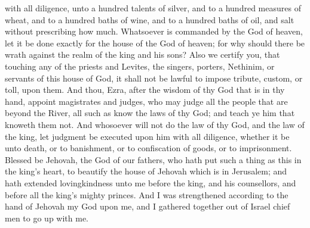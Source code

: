 with all diligence, unto a hundred talents of silver, and to a hundred measures of wheat, and to a hundred baths of wine, and to a hundred baths of oil, and salt without prescribing how much. Whatsoever is commanded by the God of heaven, let it be done exactly for the house of the God of heaven; for why should there be wrath against the realm of the king and his sons? Also we certify you, that touching any of the priests and Levites, the singers, porters, Nethinim, or servants of this house of God, it shall not be lawful to impose tribute, custom, or toll, upon them. And thou, Ezra, after the wisdom of thy God that is in thy hand, appoint magistrates and judges, who may judge all the people that are beyond the River, all such as know the laws of thy God; and teach ye him that knoweth them not. And whosoever will not do the law of thy God, and the law of the king, let judgment be executed upon him with all diligence, whether it be unto death, or to banishment, or to confiscation of goods, or to imprisonment.  Blessed be Jehovah, the God of our fathers, who hath put such a thing as this in the king’s heart, to beautify the house of Jehovah which is in Jerusalem; and hath extended lovingkindness unto me before the king, and his counsellors, and before all the king’s mighty princes. And I was strengthened according to the hand of Jehovah my God upon me, and I gathered together out of Israel chief men to go up with me. 

